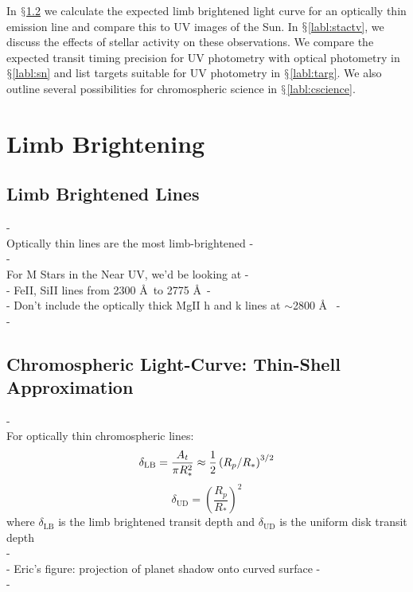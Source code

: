 \documentclass[manuscript]{aastex}
\begin{document}
In $\mathsection$\ref{labl:chromlcurve} we calculate the expected limb
brightened light curve for an optically thin emission line and compare
this to UV images of the Sun. In $\mathsection$\ref{labl:stactv}, we
discuss the effects of stellar activity on these observations. We
compare the expected transit timing precision for UV photometry with
optical photometry in $\mathsection$\ref{labl:sn} and list targets
suitable for UV photometry in $\mathsection$\ref{labl:targ}. We
also outline several possibilities for chromospheric science in
$\mathsection$\ref{labl:cscience}.


\section{Limb Brightening}
\label{labl:limbbright}
\subsection{Limb Brightened Lines}
-\\
Optically thin lines are the most limb-brightened
-\\
-\\
For M Stars in the Near UV, we'd be looking at 
-\\
- FeII, SiII lines from 2300 \AA\  to 2775 \AA\ 
-\\
- Don't include the optically thick MgII h and k lines at
$\sim$2800 \AA\ \citep{2007PASP..119...67H}
-\\
-\\

\subsection{Chromospheric Light-Curve: Thin-Shell Approximation} \label{labl:chromlcurve}

-\\
For optically thin chromospheric lines:
\begin{equation}
\delta_{\mathrm{LB}} = {A_t \over \pi R_*^2} \approx \frac{1}{2}\left( R_p/R_* \right)^{3/2}
\end{equation}
\begin{equation}
\delta_{\mathrm{UD}} = \left( \frac{R_p}{R_*} \right)^2
\end{equation}
where $\delta_{\mathrm{LB}}$ is the limb brightened transit depth and
$\delta_{\mathrm{UD}}$ is the uniform disk transit depth \\
 -\\
 - Eric's figure: projection of planet shadow onto curved surface
 -\\ - \\
\end{document}
